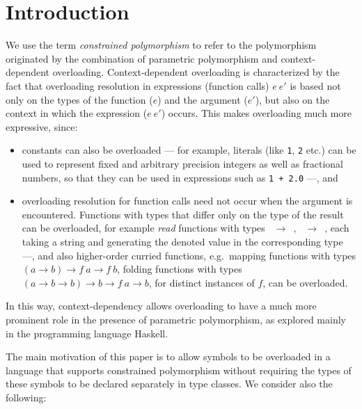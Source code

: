 \section{Introduction}
\label{sec:intro}

We use the term {\em constrained polymorphism\/} to refer to the
polymorphism originated by the combination of parametric polymorphism
and context-dependent overloading.  Context-dependent overloading is
characterized by the fact that overloading resolution in expressions
(function calls) $e\: e'$ is based not only on the types of the
function ($e$) and the argument ($e'$), but also on the context in
which the expression ($e\: e'$) occurs. This makes overloading much
more expressive, since:

\begin{itemize}

  \item constants can also be overloaded --- for example, literals
    (like {\tt 1}, {\tt 2} etc.) can be used to represent fixed and
    arbitrary precision integers as well as fractional numbers, so
    that they can be used in expressions such as {\tt \mbox{1 + 2.0}}
    ---, and

  \item overloading resolution for function calls need not occur when
    the argument is encountered.  Functions with types that differ
    only on the type of the result can be overloaded, for example {\em
      read\/} functions with types {\tt \String\ $\rightarrow$ \Bool},
    {\tt \String\ $\rightarrow$ \Int}, each taking a string and
    generating the denoted value in the corresponding type ---, and
    also higher-order curried functions, e.g.~mapping functions with
    types {\tt $(a\rightarrow b)\rightarrow f\:a\rightarrow f\:b$},
    folding functions with types {\tt $(a\rightarrow b\rightarrow
      b)\rightarrow b\rightarrow f\:a\rightarrow b$}, for distinct
    instances of $f$, can be overloaded.

\end{itemize}

In this way, context-dependency allows overloading to have a much more
prominent role in the presence of parametric polymorphism, as explored
mainly in the programming language Haskell.

The main motivation of this paper is to allow symbols to be overloaded
in a language that supports constrained polymorphism without requiring
the types of these symbols to be declared separately in type classes.
We consider also the following:

